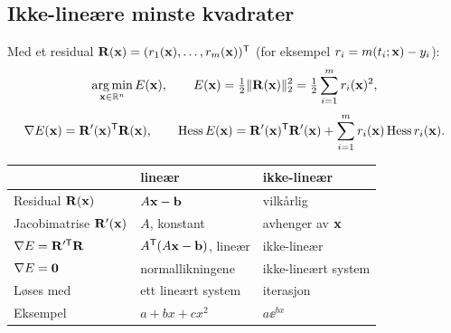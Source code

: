 

\subsection{Ikke-lineære minste kvadrater}
\begin{defn}
Med et residual $\mathbf{R}(\mathbf{x})=(r_1(\mathbf{x}),\dots,r_m(\mathbf{x}))^{\mathsf{T}}$ (for eksempel $r_i=m(t_i;\mathbf{x})-y_i$):
\[
\operatorname*{arg\,min}_{\mathbf{x}\in\mathbb{R}^n}E(\mathbf{x}),\qquad E(\mathbf{x})=\tfrac12\lVert \mathbf{R}(\mathbf{x})\rVert_2^2=\tfrac12\sum_{i=1}^mr_i(\mathbf{x})^2,
\]
\[
\nabla E(\mathbf{x})=\mathbf{R}'(\mathbf{x})^{\mathsf{T}}\mathbf{R}(\mathbf{x}),\qquad \operatorname{Hess} E(\mathbf{x})=\mathbf{R}'(\mathbf{x})^{\mathsf{T}}\mathbf{R}'(\mathbf{x})+\sum_{i=1}^mr_i(\mathbf{x})\operatorname{Hess} r_i(\mathbf{x}).
\]
\end{defn}
\begin{center}
\small
\begin{tabular}{@{}lll@{}}
\toprule
& lineær & ikke-lineær\\
\midrule
Residual $\mathbf{R}(\mathbf{x})$ & $A\mathbf{x}-\mathbf{b}$ & vilkårlig\\
Jacobimatrise $\mathbf{R}'(\mathbf{x})$ & $A$, konstant & avhenger av $\mathbf{x}$\\
$\nabla E=\mathbf{R}'^{\mathsf{T}}\mathbf{R}$ & $A^{\mathsf{T}}(A\mathbf{x}-\mathbf{b})$, lineær & ikke-lineær\\
$\nabla E=\mathbf{0}$ & normallikningene & ikke-lineært system\\
Løses med & ett lineært system & iterasjon\\
Eksempel & $a+bx+cx^2$ & $a\ee^{bx}$\\
\bottomrule
\end{tabular}
\end{center}


